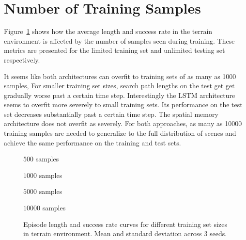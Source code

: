 \section{Number of Training Samples}
\label{sec:sample}

Figure~\ref{fig:sample} shows how the average length and success rate in the terrain environment is affected by the number of samples seen during training.
These metrics are presented for the limited training set and unlimited testing set respectively.

It seems like both architectures can overfit to training sets of as many as 1000 samples,
For smaller training set sizes, search path lengths on the test get get gradually worse past a certain time step.
Interestingly the LSTM architecture seems to overfit more severely to small training sets.
Its performance on the test set decreases substantially past a certain time step.
The spatial memory architecture does not overfit as severely.
For both approaches, as many as 10000 training samples are needed to generalize to the full distribution of scenes and achieve the same performance on the training and test sets. 

\begin{figure}
    \centering
    \(500\) samples
    
    \(1000\) samples
    
    \(5000\) samples
    
    \(10000\) samples
    
    \caption[Learning curves for varying training set sizes.]{Episode length and success rate curves for different training set sizes in terrain environment. Mean and standard deviation across 3 seeds.}
    \label{fig:sample}
\end{figure}
